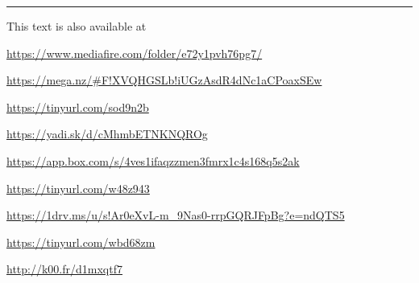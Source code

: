 \documentclass[parskip=half,fontsize=12pt]{scrartcl}%
\begin{document}
%
\bigskip\bigskip\hrule\bigskip

This text is also available at 

\href{https://www.mediafire.com/folder/e72y1pvh76pg7/}{https://www.mediafire.com/folder/e72y1pvh76pg7/}

\href{https://mega.nz/#F!XVQHGSLb!iUGzAsdR4dNc1aCPoaxSEw}{https://mega.nz/\#F!XVQHGSLb!iUGzAsdR4dNc1aCPoaxSEw}

\href{https://tinyurl.com/sod9n2b}{https://tinyurl.com/sod9n2b}

\href{https://yadi.sk/d/cMhmbETNKNQROg}{https://yadi.sk/d/cMhmbETNKNQROg}

\href{https://app.box.com/s/4ves1ifaqzzmen3fmrx1c4s168q5s2ak}{https://app.box.com/s/4ves1ifaqzzmen3fmrx1c4s168q5s2ak}

\href{https://tinyurl.com/w48z943}{https://tinyurl.com/w48z943}

\href{https://1drv.ms/u/s!Ar0eXvL-m_9Nas0-rrpGQRJFpBg?e=ndQTS5}{https://1drv.ms/u/s!Ar0eXvL-m\_9Nas0-rrpGQRJFpBg?e=ndQTS5}

\href{https://tinyurl.com/wbd68zm}{https://tinyurl.com/wbd68zm}

\href{http://k00.fr/d1mxqtf7}{http://k00.fr/d1mxqtf7}
\end{document}
